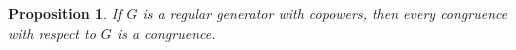 \documentclass[12pt,amstex,leqno]{amsart}
\newcommand\ck{\mathcal {K}}
\newtheorem{prop}[theorem]{Proposition}
\theoremstyle{definition}
\newtheorem{example}[theorem]{Example}
\newtheorem{remark}[theorem]{Remark}
\numberwithin{equation}{section}
\begin{document}
% 
% 
% 
% 
%
%
%
%

\begin{prop}\label{L:G}
If $G$ is a regular generator with copowers,  then every congruence with respect to $G$ is a congruence.
\end{prop}
\end{document}

